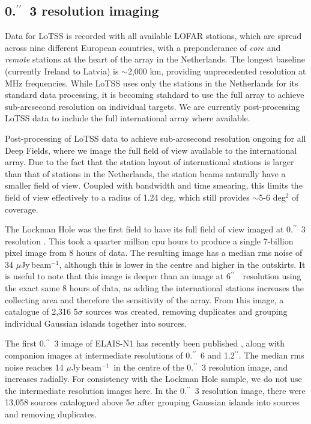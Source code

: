 \documentclass[usenatbib,fleqn,letters]{mnras}
\newcommand{\sarc}{$^{\prime\prime}\!\!$}
\newcommand{\muJybm}{$\mu$Jy$\,$beam$^{-1}$}
\begin{document}
\subsection{0.\sarc\ 3 resolution imaging}
\label{subsec:highres}

Data for LoTSS is recorded with all available LOFAR stations, which are spread across nine different European countries, with a preponderance of \textit{core} and \textit{remote} stations at the heart of the array in the Netherlands. The longest baseline (currently Ireland to Latvia) is $\sim$2,000 km, providing unprecedented resolution at MHz frequencies. While LoTSS uses only the stations in the Netherlands for its standard data processing, it is becoming stahdard to use the full array to achieve sub-arcsecond resolution \citep[e.g.,][]{morabito_sub-arcsecond_2022} on individual targets. We are currently post-processing LoTSS data to include the full international array where available. 

Post-processing of LoTSS data to achieve sub-arcsecond resolution ongoing for all Deep Fields, where we image the full field of view available to the international array. Due to the fact that the station layout of international stations is larger than that of stations in the Netherlands, the station beams naturally have a smaller field of view. Coupled with bandwidth and time smearing, this limits the field of view effectively to a radius of 1.24 deg, which still provides $\sim$5-6 deg$^2$ of coverage. 

The Lockman Hole was the first field to have its full field of view imaged at 0.\sarc\ 3 resolution \citep{sweijen_deep_2022}. This took a quarter million cpu hours to produce a single 7-billion pixel image from 8 hours of data. The resulting image has a median rms noise of 34 \muJybm , although this is lower in the centre and higher in the outskirts. It is useful to note that this image is deeper than an image at 6\sarc\ \ resolution using the exact same 8 hours of data, as adding the international stations increases the collecting area and therefore the sensitivity of the array. From this image, a catalogue of 2,316 5$\sigma$ sources was created, removing duplicates and grouping individual Gaussian islands together into sources. 

The first 0.\sarc\ 3 image of ELAIS-N1 has recently been published \citep{de_jong_into_2024}, along with companion images at intermediate resolutions of 0.\sarc\ 6 and 1.2\sarc . The median rms noise reaches 14 \muJybm\ in the centre of the 0.\sarc\ 3 resolution image, and increases radially. For consistency with the Lockman Hole sample, we do not use the intermediate resolution images here. In the 0.\sarc\ 3 resolution image, there were 13,058 sources catalogued above 5$\sigma$ after grouping Gaussian islands into sources and removing duplicates. 
\end{document}
